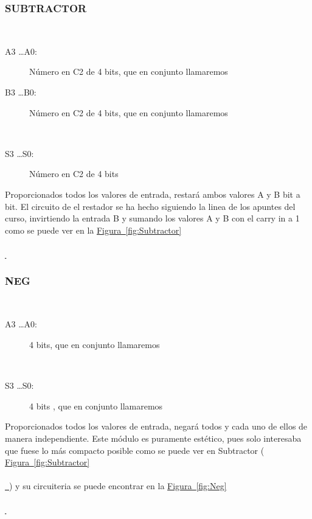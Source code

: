 \documentclass{article}
\newcommand*{\figref}[2][]{
  \hyperref[{fig:#2}]{
    Figura~\ref*{fig:#2}
    \ifx\\#1\\%
    \else
      \,#1
    \fi
  }
}
\begin{document}
\newpage

\subsubsection{SUBTRACTOR}
\label{sec:SUBTRACTOR}
\begin{description}

    \item[Entradas: ] 
    \begin{description}
        \item[A3 \dots A0:] Número en C2 de 4 bits, que en conjunto llamaremos 
        \item[B3 \dots B0:] Número en C2 de 4 bits, que en conjunto llamaremos 
    \end{description}
    
    \item[Salidas: ] 
    \begin{description}
        \item[S3 \dots S0:] Número en C2 de 4 bits 
    \end{description}
    
    \item[Función: ] Proporcionados todos los valores de entrada, restará ambos valores A y B bit a bit. El circuito de el restador se ha hecho siguiendo la linea de los apuntes del curso, invirtiendo la entrada B y sumando los valores A y B con el carry in a 1 como se puede ver en la\figref{Subtractor}
\end{description}

\subsubsection{NEG}
\label{sec:NEG}
\begin{description}
    \item[Entradas: ] 
    \begin{description}
        \item[A3 \dots A0:] 4 bits, que en conjunto llamaremos 
    \end{description}
    
    \item[Salidas: ] 
    \begin{description}
        \item[S3 \dots S0:] 4 bits , que en conjunto llamaremos 
    \end{description}
    
    \item[Función: ] Proporcionados todos los valores de entrada, negará todos y cada uno de ellos de manera independiente. Este módulo es puramente estético, pues solo interesaba que fuese lo más compacto posible como se puede ver en Subtractor (\figref{Subtractor}) y su circuiteria se puede encontrar en la\figref{Neg}
    
\end{description}
\end{document}
